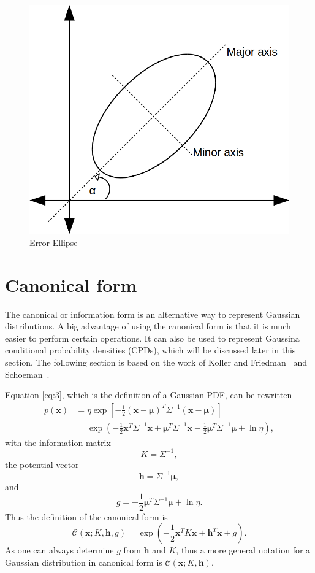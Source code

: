 \documentclass[12pt,oneside,openany,a4paper, %
afrikaans,english,
]{memoir}
\numberwithin{equation}{chapter}
\begin{document}
\begin{figure}[H]
  \includegraphics[width=0.5\linewidth]{Figures/e_ellipse.png}
  \centering
  \caption{Error Ellipse}
  \label{fig:e_ellipse}
\end{figure}
\section{Canonical form}
The canonical or information form is an alternative way to represent Gaussian distributions. A big advantage of using the canonical form is that it is much easier to perform certain operations. It can also be used to represent Gaussina conditional probability densities (CPDs), which will be discussed later in this section. The following section is based on the work of Koller and Friedman~\cite{koller} and Schoeman~\citep{JC}.

Equation \ref{eq:3}, which is the definition of a Gaussian PDF, can be rewritten
\begin{equation}
\begin{split}\label{eq:6}
p(\bm{x}) & = \eta\exp\left[-\frac{1}{2}(\bm{x}-\bm{\mu})^T\Sigma^{-1}(\bm{x}-\bm{\mu})\right]\\
& = \exp\left(-\frac{1}{2}\bm{x}^T\Sigma^{-1}\bm{x} + \bm{\mu}^T\Sigma^{-1}\bm{x} - \frac{1}{2}\bm{\mu}^T\Sigma^{-1}\bm{\mu} + \ln{\eta}\right),
\end{split}
\end{equation}
with the information matrix
\begin{equation}\label{eq:7}
K = \Sigma^{-1},
\end{equation}
the potential vector
\begin{equation}\label{eq:8}
\bm{h} = \Sigma^{-1}\bm{\mu},
\end{equation}
and
\begin{equation}\label{eq:9}
g = - \frac{1}{2}\bm{\mu}^T\Sigma^{-1}\bm{\mu} + \ln{\eta}.
\end{equation}
Thus the definition of the canonical form is
\begin{equation}\label{eq:canonical}
\mathcal{C}(\bm{x}; K,\bm{h},g) = \exp\left(-\frac{1}{2}\bm{x}^TK\bm{x} + \bm{h}^T\bm{x} +g \right).
\end{equation}
As one can always determine $g$ from $\bm{h}$ and $K$, thus a more general notation for a Gaussian distribution in canonical form is $\mathcal{C}(\bm{x}; K,\bm{h})$.
\end{document}
